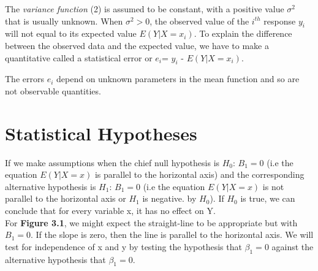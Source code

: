 \documentclass{article}
\begin{document}
    The \textit{variance function} (2) is assumed to be constant, with a positive value ${\sigma ^ {2}}$ that is usually unknown. When ${\sigma ^ {2} > 0}$, the observed value of the ${i^{th}}$ response ${y_{i}}$ will not equal to its expected value ${E(Y|X=x_{i})}$. To explain the difference between the observed data and the expected value, we have to make a quantitative called a statistical error or ${e_{i}}$= ${y_{i}}$ - ${E(Y|X=x_{i})}$. 
    
    The errors ${e_{i}}$ depend on unknown parameters in the mean function and so are not observable quantities.

\section{Statistical Hypotheses}
    If we make assumptions when the chief null hypothesis is ${H_{0}}$: ${B_{1} = 0}$ (i.e the equation ${E(Y|X=x)}$ is parallel to the horizontal axis) and the corresponding alternative hypothesis is ${H_{1}}$: ${B_{1} = 0}$ (i.e the equation ${E(Y|X=x)}$ is not parallel to the horizontal axis or ${H_{1}}$ is negative. by ${H_{0}}$). If ${H_{0}}$ is true, we can conclude that for every variable x, it has no effect on Y. 
    \\
    
    For \textbf{Figure 3.1}, we might expect the straight-line to be appropriate but with ${B_{1} = 0}$. If the slope is zero, then the line is parallel to the horizontal axis. We will test for independence of x and y by testing the hypothesis that ${\beta_{1} = 0}$ against the alternative hypothesis that ${\beta_{1} = 0}$.
    
\end{document}
